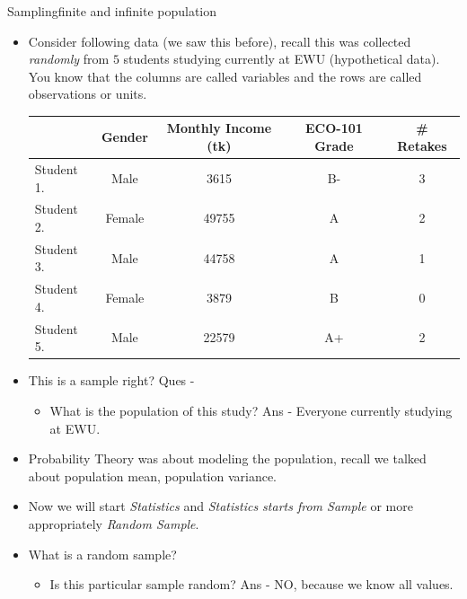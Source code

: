 \documentclass[8pt, usepdftitle=false]{beamer}
\begin{document}
\begin{frame}[allowframebreaks]{Sampling}{finite and infinite population}

\begin{itemize}
 

   \item Consider following data (we saw this before), recall this was collected \emph{randomly} from $5$ students studying currently at EWU (hypothetical data). You know that the columns are called \alert{variables} and the rows are called \alert{observations} or \alert{units}.

      \medskip
      \begin{tabular}{l|c|c|c|c}
      \hline
       & Gender & Monthly Income (tk) & ECO-101 Grade & \# Retakes\\
      \hline
      Student 1. & Male & 3615 & B- & 3\\
      \hline
      Student 2. & Female & 49755 & A & 2\\
      \hline
      Student 3. & Male & 44758 & A & 1\\
      \hline
      Student 4. & Female & 3879 & B & 0\\
      \hline
      Student 5. & Male & 22579 & A+ & 2 \\
      \hline
      \end{tabular}

\bigskip
  \item This is \alert{a sample} right? Ques - 

    \begin{itemize}
        \item[]   What is \alert{the population} of this study? Ans - Everyone currently studying at EWU. 
    \end{itemize}

  \item Probability Theory was about modeling the population, recall we talked about population mean, population variance.  

  \item Now we will start \emph{Statistics} and \emph{Statistics starts from Sample} or more appropriately \emph{Random Sample}.

\framebreak

    \item What is a random sample? 

    \begin{itemize}
        \item    Is this particular sample random? Ans - NO, because we know all values.


\end{itemize}
\end{itemize}
\end{frame}
\end{document}
